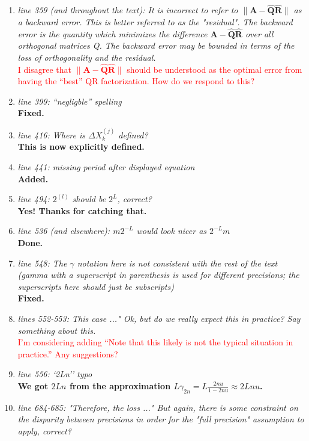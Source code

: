\documentclass[final,onefignum,onetabnum]{siamart190516}
\newcommand{\bb}[1]{\mathbf{#1}}
\newcommand{\red}[1]{\textcolor{red}{#1}}
\begin{document}
\begin{enumerate}
    \item {\it line 359 (and throughout the text): It is incorrect to refer to $\|\bb{A}-\hat{\bb{Q}}\hat{\bb{R}}\|$ as a backward error. This is better referred to as the "residual". The backward error is the quantity which minimizes the difference $\bb{A}-\hat{\bb{Q}}\hat{\bb{R}}$ over all orthogonal matrices Q. The backward error may be bounded in terms of the loss of orthogonality and the residual. } \\
    \red{ I disagree that $\|\bb{A}-\hat{\bb{Q}}\hat{\bb{R}}\|$ should be understood as the optimal error from having the ``best'' QR factorization. How do we respond to this? }
    \item {\it line 399: ``negligble'' spelling }\\
    {\bf Fixed.}
    \item {\it line 416: Where is $\Delta X_k^{(j)}$ defined? }\\
    {\bf This is now explicitly defined.}
    \item {\it line 441: missing period after displayed equation }\\
    {\bf Added.}
    \item {\it line 494: $2^{(l)}$ should be $2^L$, correct? }\\
    {\bf Yes! Thanks for catching that.}
    \item {\it line 536 (and elsewhere): $m2^{-L}$ would look nicer as $2^{-L}m$ }\\
    {\bf Done.}
    \item {\it line 548: The $\gamma$ notation here is not consistent with the rest of the text (gamma with a superscript in parenthesis is used for different precisions; the superscripts here should just be subscripts) }\\
    {\bf Fixed.}
    \item {\it lines 552-553: This case ..." Ok, but do we really expect this in practice? Say something about this. }\\
    \red{I'm considering adding ``Note that this likely is not the typical situation in practice.'' Any suggestions?}
    \item {\it line 556: `2Ln'' typo }\\
    {\bf We got $2Ln$ from the approximation $L\gamma_{2n}=L\frac{2nu}{1-2nu}\approx 2Lnu$.}
    \item {\it line 684-685: "Therefore, the loss ..." But again, there is some constraint on the disparity between precisions in order for the "full precision" assumption to apply, correct? }\\

\end{enumerate}
\end{document}
